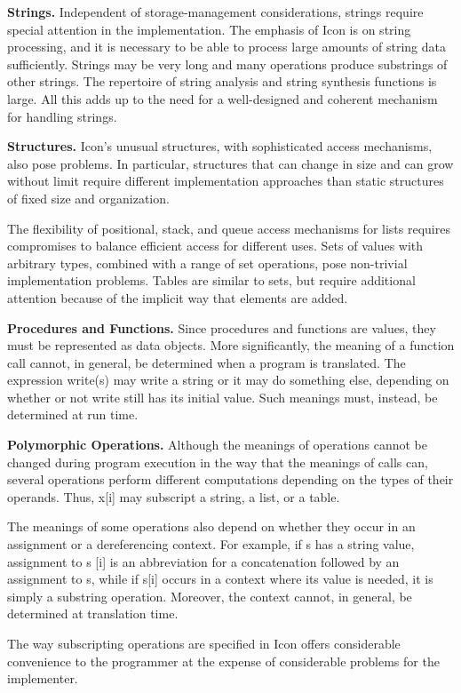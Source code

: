 \textbf{Strings.} Independent of storage-management considerations,
strings require special attention in the implementation. The emphasis
of Icon is on string processing, and it is necessary to be able to
process large amounts of string data sufficiently. Strings may be very
long and many operations produce substrings of other strings. The
repertoire of string analysis and string synthesis functions is
large. All this adds up to the need for a well-designed and coherent
mechanism for handling strings.


\textbf{Structures.} Icon's unusual structures, with sophisticated
access mechanisms, also pose problems. In particular, structures that
can change in size and can grow without limit require different
implementation approaches than static structures of fixed size and
organization.


The flexibility of positional, stack, and queue access mechanisms for
lists requires compromises to balance efficient access for different
uses. Sets of values with arbitrary types, combined with a range of
set operations, pose non-trivial implementation problems. Tables are
similar to sets, but require additional attention because of the
implicit way that elements are added.


\textbf{Procedures and Functions.} Since procedures and functions are
values, they must be represented as data objects.  More significantly,
the meaning of a function call cannot, in general, be determined when
a program is translated. The expression write(s) may write a string or
it may do something else, depending on whether or not write still has
its initial value. Such meanings must, instead, be determined at run
time.


\textbf{Polymorphic Operations.} Although the meanings of operations
cannot be changed during program execution in the way that the
meanings of calls can, several operations perform different
computations depending on the types of their operands. Thus, x[i] may
subscript a string, a list, or a table.

The meanings of some operations also depend on whether they occur in
an assignment or a dereferencing context. For example, if s has a
string value, assignment to s [i] is an abbreviation for a
concatenation followed by an assignment to s, while if s[i] occurs in
a context where its value is needed, it is simply a substring
operation. Moreover, the context cannot, in general, be determined at
translation time.

The way subscripting operations are specified in Icon offers
considerable convenience to the programmer at the expense of
considerable problems for the implementer.


